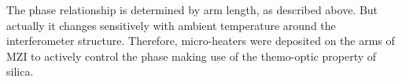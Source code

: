 \documentclass[letterpaper, 10pt]{article}
\begin{document}

The phase relationship is determined by arm length, as described above.
But actually it changes sensitively with ambient temperature around the interferometer structure.
Therefore, micro-heaters were deposited on the arms of MZI to actively control the phase making use of the themo-optic property of silica.

\end{document}
